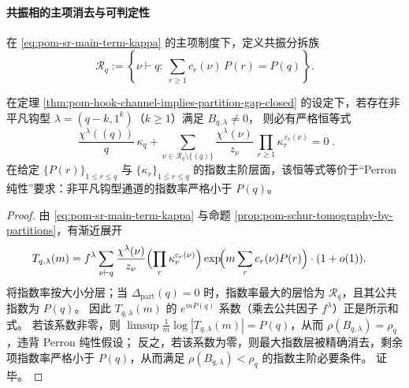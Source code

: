 \paragraph{共振相的主项消去与可判定性}
在 \eqref{eq:pom-sr-main-term-kappa} 的主项制度下，定义共振分拆族
\[
\mathcal{R}_q:=\left\{\nu\vdash q:\ \sum_{r\ge 1}c_r(\nu)\,P(r)=P(q)\right\}.
\]

\begin{theorem}[钩型通道主项消去的代数约束]\label{thm:pom-hook-channel-leading-term-cancellation}
在定理 \ref{thm:pom-hook-channel-implies-partition-gap-closed} 的设定下，若存在非平凡钩型 \(\lambda=(q-k,1^k)\)（\(k\ge 1\)）满足 \(B_{q,\lambda}\neq 0\)，
则必有严格恒等式
\[
\boxed{\;
\frac{\chi^\lambda((q))}{q}\,\kappa_q
+\sum_{\nu\in\mathcal{R}_q\setminus\{(q)\}}
\frac{\chi^\lambda(\nu)}{z_\nu}\,
\prod_{r\ge 1}\kappa_r^{\,c_r(\nu)}
=0\; }.
\]
在给定 \(\{P(r)\}_{1\le r\le q}\) 与 \(\{\kappa_r\}_{1\le r\le q}\) 的指数主阶层面，该恒等式等价于“Perron 纯性”要求：非平凡钩型通道的指数率严格小于 \(P(q)\)。
\end{theorem}
\begin{proof}
由 \eqref{eq:pom-sr-main-term-kappa} 与命题 \ref{prop:pom-schur-tomography-by-partitions}，有渐近展开
\[
\begin{aligned}
T_{q,\lambda}(m)
&=
f^\lambda\sum_{\nu\vdash q}\frac{\chi^\lambda(\nu)}{z_\nu}
\Bigl(\prod_r \kappa_r^{c_r(\nu)}\Bigr)
\exp\!\Bigl(m\sum_r c_r(\nu)P(r)\Bigr)\cdot(1+o(1)).
\end{aligned}
\]
将指数率按大小分层；当 \(\Delta_{\mathrm{part}}(q)=0\) 时，指数率最大的层恰为 \(\mathcal{R}_q\)，且其公共指数为 \(P(q)\)。
因此 \(T_{q,\lambda}(m)\) 的 \(e^{mP(q)}\) 系数（乘去公共因子 \(f^\lambda\)）正是所示和式。
若该系数非零，则 \(\limsup \frac1m\log|T_{q,\lambda}(m)|=P(q)\)，从而 \(\rho(B_{q,\lambda})=\rho_q\)，违背 Perron 纯性假设；
反之，若该系数为零，则最大指数层被精确消去，剩余项指数率严格小于 \(P(q)\)，从而满足 \(\rho(B_{q,\lambda})<\rho_q\) 的指数主阶必要条件。
证毕。
\end{proof}

